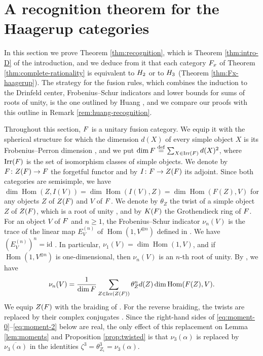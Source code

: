 \documentclass[leqno]{article}
\let\cal\relax
\newcommand{\cal}{\mathcal}
\renewcommand{\geq}{\ensuremath{\geqslant}}
\newcommand{\co}{\colon}
\newcommand{\ot}{\otimes}
\newcommand{\ovl}{\overline}
\newcommand{\ov}{\overset}
\DeclareMathOperator{\Irr}{Irr} %
\numberwithin{equation}{section}
\begin{document}
\section{A recognition theorem for the Haagerup categories}
\label{sec:recognition}

In this section we prove Theorem \ref{thm:recognition}, which is Theorem \ref{thm:intro-D} of the introduction, and we deduce from it that each category $\cal F_x$ of Theorem \ref{thm:complete-rationality} is equivalent to $\cal H_2$ or to $\cal H_3$ (Theorem \ref{thm:Fx-haagerup}). The strategy for the fusion rules, which combines the induction to the Drinfeld center, Frobenius--Schur indicators and lower bounds for sums of roots of unity, is the one outlined by Huang \cite[Sections 5 and 6 pp.~7--9]{Hua26}, and we compare our proofs with this outline in Remark \ref{rem:huang-recognition}.

Throughout this section, $\cal F$ is a unitary fusion category. We equip it with the spherical structure for which the dimension $d(X)$ of every simple object $X$ is its Frobenius--Perron dimension \cite[Proposition 8.23 p.~34]{ENO05}, and we put $\dim \cal F \ov{\mathrm{def}}{=} \sum_{X \in \Irr(\cal F)} d(X)^2$, where $\Irr(\cal F)$ is the set of isomorphism classes of simple objects. We denote by $F \co Z(\cal F) \to \cal F$ the forgetful functor and by $I \co \cal F \to Z(\cal F)$ its adjoint. Since both categories are semisimple, we have $\dim\operatorname{Hom}(Z,I(V)) = \dim\operatorname{Hom}(I(V),Z) = \dim\operatorname{Hom}(F(Z),V)$ for any objects $Z$ of $Z(\cal F)$ and $V$ of $\cal F$. We denote by $\theta_Z$ the twist of a simple object $Z$ of $Z(\cal F)$, which is a root of unity \cite[p.~9 and Theorem 5.5 p.~13]{NS07}, and by $K(\cal F)$ the Grothendieck ring of $\cal F$. For an object $V$ of $\cal F$ and $n \geq 1$, the Frobenius--Schur indicator $\nu_n(V)$ is the trace of the linear map $E_V^{(n)}$ of $\operatorname{Hom}(1,V^{\ot n})$ defined in \cite[p.~8]{NS07b}. We have $(E^{(n)}_V)^n = \mathrm{id}$ \cite[Theorem 5.1 p.~12]{NS07b}. In particular, $\nu_1(V) = \dim\operatorname{Hom}(1,V)$, and if $\operatorname{Hom}(1,V^{\ot n})$ is one-dimensional, then $\nu_n(V)$ is an $n$-th root of unity. By \cite[Theorem 4.1 p.~10]{NS07}, we have
\begin{equation}
\label{eq:NS-formula}
\nu_n(V) = \frac{1}{\dim \cal F}\sum_{Z \in \Irr(Z(\cal F))} \theta_Z^n  d(Z) \dim \operatorname{Hom}(F(Z),V).
\end{equation}
We equip $Z(\cal F)$ with the braiding of \cite[Theorem 4.1 p.~10]{NS07}. For the reverse braiding, the twists are replaced by their complex conjugates \cite[Remark 4.3 p.~10]{NS07}. Since the right-hand sides of \eqref{eq:moment-0}--\eqref{eq:moment-2} below are real, the only effect of this replacement on Lemma \ref{lem:moments} and Proposition \ref{prop:twisted} is that $\nu_3(\alpha)$ is replaced by $\ovl{\nu_3(\alpha)}$ in the identities $\zeta^3 = \theta_{Z_i}^3 = \nu_3(\alpha)$.
\end{document}
